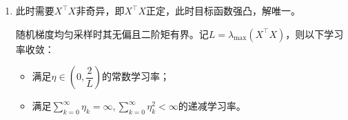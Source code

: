 \documentclass[cn,hazy,cyan,11pt,normal]{elegantnote}
\begin{document}
\begin{enumerate}
{\begin{enumerate}
{                    $e_{k+1}=\sum_{j\neq i}\dfrac{x_j^{\top}e_k}{\|x_i\|_2^2}x_j+\dfrac{x_i^{\top}e_k}{\|x_i\|_2^2}(1-\|x_i\|_2^2\eta)x_j+e^{\perp}$，若误差减少，则$(1-\|x_i\|_2^2\eta)<1,\forall i$。

                    此时需要$\eta\in\left(0,\dfrac2{\max\limits_i\|x_i\|_2^2}\right)$，此时取固定步长 $\eta=\dfrac1{\max\limits_i\|x_i\|_2^2}$即可。\vspace{0.25cm}
                }
                \item {此时需要$X^{\top}X$非奇异，即$X^{\top}X$正定，此时目标函数强凸，解唯一。

                    随机梯度均匀采样时其无偏且二阶矩有界。记$L=\lambda_{\max}(X^{\top}X)$，则以下学习率收敛：

                    \begin{itemize}
                        \item 满足$\eta\in\left( 0,\dfrac2L \right)$的常数学习率；
                        \item 满足$\sum_{k=0}^{\infty}\eta_k=\infty,\sum_{k=0}^{\infty}\eta_k^2<\infty$的递减学习率。
                    \end{itemize}

                }
            \end{enumerate}

        }


    \end{enumerate}
\end{document}
